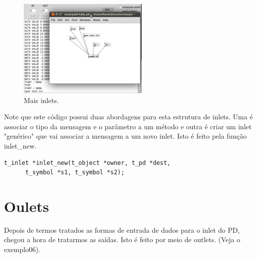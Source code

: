 \documentclass[10pt,a4paper]{report}
\begin{document}
\begin{figure}[h!]
	\centering
	\includegraphics[height=180]{./images/example8}
	\caption{Mais inlets.}
\end{figure}


Note que este código possui duas abordagens para esta estrutura de inlets. Uma é associar o tipo da mensagem e o parâmetro a um método e outra é criar um inlet "genérico" que vai associar a mensagem a um novo inlet. Isto é feito pela função inlet\_new.

\begin{lstlisting}
t_inlet *inlet_new(t_object *owner, t_pd *dest,
      t_symbol *s1, t_symbol *s2);
\end{lstlisting}

\section{Oulets}

Depois de termos tratados as formas de entrada de dados para o inlet do PD, chegou a hora de tratarmos as saídas. Isto é feito por meio de outlets. (Veja o exemplo06).
\end{document}

